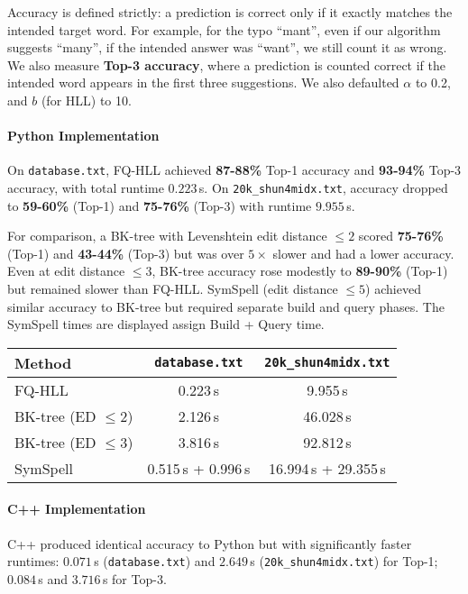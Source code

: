 \documentclass[12pt,a4paper]{article}
\begin{document}
Accuracy is defined strictly: a prediction is correct only if it exactly matches the intended target word. For example, for the typo ``mant'', even if our algorithm suggests ``many'', if the intended answer was ``want'', we still count it as wrong. We also measure \textbf{Top-3 accuracy}, where a prediction is counted correct if the intended word appears in the first three suggestions. We also defaulted $\alpha$ to 0.2, and $b$ (for HLL) to 10.

\paragraph{Python Implementation}
On \texttt{database.txt}, FQ-HLL achieved \textbf{87-88\%} Top-1 accuracy and \textbf{93-94\%} Top-3 accuracy, with total runtime $0.223$\,s. On \texttt{20k\_shun4midx.txt}, accuracy dropped to \textbf{59-60\%} (Top-1) and \textbf{75-76\%} (Top-3) with runtime $9.955$\,s. \newline

For comparison, a BK-tree with Levenshtein edit distance $\leq 2$ scored \textbf{75-76\%} (Top-1) and \textbf{43-44\%} (Top-3) but was over $5\times$ slower and had a lower accuracy. Even at edit distance $\leq 3$, BK-tree accuracy rose modestly to \textbf{89-90\%} (Top-1) but remained slower than FQ-HLL. SymSpell (edit distance $\leq 5$) achieved similar accuracy to BK-tree but required separate build and query phases. The SymSpell times are displayed assign Build + Query time.

\begin{center}
  \begin{tabular}{lcc}
    \toprule
    \textbf{Method} & \texttt{database.txt} & \texttt{20k\_shun4midx.txt} \\
    \midrule
    FQ-HLL & 0.223\,s & 9.955\,s \\
    BK-tree (ED $\leq 2$) & 2.126\,s & 46.028\,s \\
    BK-tree (ED $\leq 3$) & 3.816\,s & 92.812\,s \\
    SymSpell & 0.515\,s + 0.996\,s & 16.994\,s + 29.355\,s \\
    \bottomrule
  \end{tabular}
\end{center}

\paragraph{C++ Implementation}
C++ produced identical accuracy to Python but with significantly faster runtimes: $0.071$\,s (\texttt{database.txt}) and $2.649$\,s (\texttt{20k\_shun4midx.txt}) for Top-1; $0.084$\,s and $3.716$\,s for Top-3.
\end{document}

